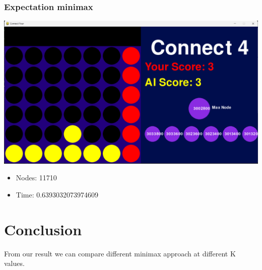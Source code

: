 \documentclass{article}
\begin{document}
\subsubsection*{Expectation minimax}
\begin{center}
    \includegraphics[width=0.8\linewidth]{testcase.png}
\end{center}
\begin{itemize}
    \item Nodes: 11710
    \item Time: 0.6393032073974609
\end{itemize}

\section{Conclusion}
From our result we can compare different minimax approach at different K values.
\end{document}
